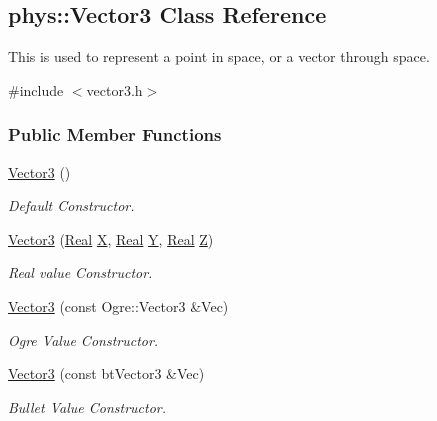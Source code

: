 \hypertarget{classphys_1_1Vector3}{
\subsection{phys::Vector3 Class Reference}
\label{d5/d6a/classphys_1_1Vector3}
}


This is used to represent a point in space, or a vector through space.  




{\ttfamily \#include $<$vector3.h$>$}

\subsubsection*{Public Member Functions}
\begin{DoxyCompactItemize}
\item 
\hyperlink{classphys_1_1Vector3_af328c400a03fdb8d2a99fd58382d61cb}{Vector3} ()
\begin{DoxyCompactList}\small\item\em Default Constructor. \item\end{DoxyCompactList}\item 
\hyperlink{classphys_1_1Vector3_af1d323b44d7b6ee3d0a79a196d9967da}{Vector3} (\hyperlink{namespacephys_af7eb897198d265b8e868f45240230d5f}{Real} \hyperlink{classphys_1_1Vector3_a23660f9d1e21a25c53aa06aa737bb56b}{X}, \hyperlink{namespacephys_af7eb897198d265b8e868f45240230d5f}{Real} \hyperlink{classphys_1_1Vector3_a6c9bc2ab0995d5056dba8272c650e58e}{Y}, \hyperlink{namespacephys_af7eb897198d265b8e868f45240230d5f}{Real} \hyperlink{classphys_1_1Vector3_a53c84fa4b38fb9c4a4d822b04c200b13}{Z})
\begin{DoxyCompactList}\small\item\em Real value Constructor. \item\end{DoxyCompactList}\item 
\hyperlink{classphys_1_1Vector3_ac08281de8f4929593b6f4469646691da}{Vector3} (const Ogre::Vector3 \&Vec)
\begin{DoxyCompactList}\small\item\em Ogre Value Constructor. \item\end{DoxyCompactList}\item 
\hyperlink{classphys_1_1Vector3_ac13a263c5e2f84578884183cee890570}{Vector3} (const btVector3 \&Vec)
\begin{DoxyCompactList}\small\item\em Bullet Value Constructor. \item\end{DoxyCompactList}\item 

\end{DoxyCompactItemize}
